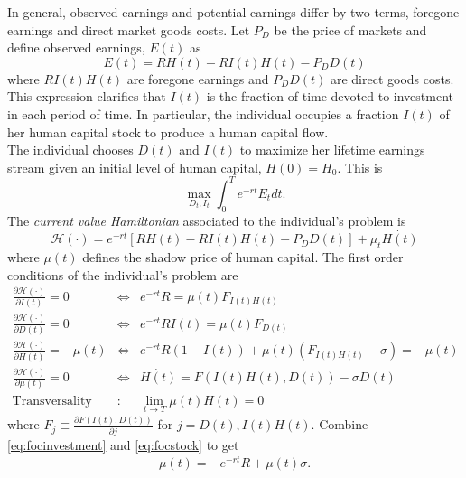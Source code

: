 \indent In general, observed earnings and potential earnings differ by two terms, foregone earnings and direct market goods costs. Let $P_{D}$ be the price of markets and define observed earnings, $E(t)$ as
\begin{equation}
E(t) = R H(t) -  R I(t) H(t) - P_{D} D(t) \label{eq:earnings}
\end{equation}
where $R I(t) H(t)$ are foregone earnings and $ P_{D} D(t) $ are direct goods costs. This expression clarifies that $I(t)$ is the fraction of time devoted to investment in each period of time. In particular, the individual occupies a fraction $I(t)$ of her human capital stock to produce a human capital flow.\\ 
\indent The individual chooses $D(t)$ and $I(t)$ to maximize her lifetime earnings stream given an initial level of human capital, $H(0) = H_{0}$. This is
\begin{equation}
\max_{D_{t}, I_{t}} \int _{0} ^{T} e^{-rt} E_{t} dt.
\end{equation}
\noindent The \textit{current value Hamiltonian} associated to the individual's problem is
\begin{equation}
\mathcal{H} (\cdot) = e^{-rt} \left[ R H(t) -  R I(t) H(t) - P_{D} D(t) \right] + \mu_{t} \dot{H(t)} 
\end{equation}
where $\mu(t)$ defines the shadow price of human capital. The first order conditions of the individual's problem are
\begin{eqnarray}
\frac{\partial \mathcal{H} (\cdot)}{\partial I(t)} = 0 &\Leftrightarrow& e^{-rt}R = \mu(t) F_{I(t)H(t)} \label{eq:focinvestment} \\
\frac{\partial \mathcal{H} (\cdot)}{\partial D(t)} = 0 &\Leftrightarrow& e^{-rt}R I(t) = \mu(t) F_{D(t)} \label{eq:focgoods} \\
\frac{\partial \mathcal{H} (\cdot)}{\partial H(t)} = - \dot{\mu(t)} &\Leftrightarrow& e^{-rt} R \left( 1 - I (t) \right) + \mu(t) \left(  F_{I(t)H(t)} - \sigma \right) = - \dot{\mu(t)} \label{eq:focstock} \\ 
\frac{\partial \mathcal{H} (\cdot)}{\partial \mu(t)} = 0 &\Leftrightarrow& \dot{H(t)} = F \left( I(t) H(t), D(t) \right) - \sigma D(t) \label{eq:focmotion} \\
\text{Transversality} &:& \lim_{t \rightarrow T} \mu(t) H(t) = 0 \label{eq:foctransversality}
\end{eqnarray}
where $F_{j} \equiv \frac{\partial F \left( I(t), D(t) \right) }{\partial j}$ for $j = D(t), I(t) H(t)$. Combine \eqref{eq:focinvestment} and \eqref{eq:focstock} to get 
\begin{equation}
\dot{\mu(t)} = - e^{-rt} R + \mu(t) \sigma \label{eq:focinvstockcombine}.
\end{equation}

